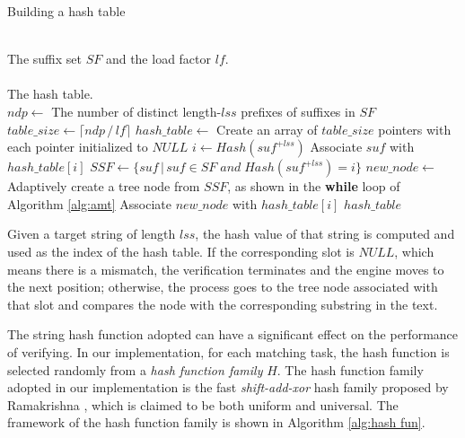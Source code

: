 \documentclass{article}
\begin{document}


\begin{algorithm}
  \caption{Building a hash table}\scriptsize
  \label{alg:hash}
  \begin{algorithmic}[1]
    \REQUIRE ~~\\
    The suffix set $SF$ and the load factor $lf$. \\
    \ENSURE ~~\\
    The hash table.\\
    \STATE
    \STATE $ndp \leftarrow$ The number of distinct length-$lss$
    prefixes of suffixes in $SF$
    \STATE $table\_size \leftarrow \lceil ndp\,/\,lf \rceil$
    \STATE $hash\_table \leftarrow$ Create an array  of
    $table\_size$ pointers with each pointer initialized to $NULL$
    \STATE
    \STATE $i \leftarrow Hash(suf^{+lss})$
    \STATE Associate $suf$ with $hash\_table[i]$
    \ENDFOR
    \STATE
    \STATE $SSF \leftarrow \{suf\,|\,suf\in SF\; and\; Hash(suf^{+lss})=i\}$
    \STATE $new\_node \leftarrow$ Adaptively create a tree node from
    $SSF$, as shown in the \textbf{while} loop of Algorithm \ref{alg:amt}
    \STATE Associate $new\_node$ with $hash\_table[i]$
    \ENDIF
    \ENDFOR
    \STATE
    \RETURN $hash\_table$
  \end{algorithmic}
\end{algorithm}

Given a target string of length $lss$, the hash value of that string
is computed and used as the index of the hash table. If the
corresponding slot is $NULL$, which means there is a mismatch, the
verification terminates and the engine moves to the next position;
otherwise, the process goes to the tree node associated with that slot
and compares the node with the corresponding substring in the text.

The string hash function adopted can have a significant effect on the
performance of verifying. In our implementation, for each matching
task, the hash function is selected randomly from a \emph{hash
  function family} $H$. The hash function family adopted in our
implementation is the fast \emph{shift-add-xor} hash family proposed
by Ramakrishna \cite{Ramakrishna1997}, which is claimed to be both
uniform and universal. The framework of the hash function family is
shown in Algorithm \ref{alg:hash fun}.
\end{document}
